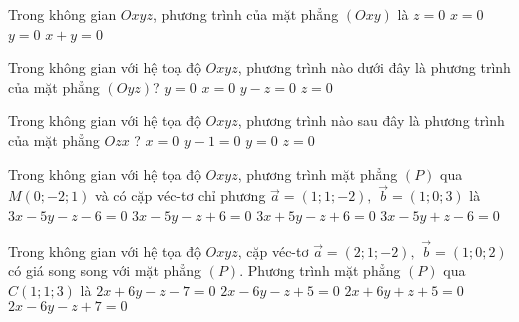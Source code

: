 \begin{ex}%
	Trong không gian $Oxyz$, phương trình của mặt phẳng $(Oxy)$ là
	\choice
	{\True $z=0$}
	{$x=0$}
	{$y=0$}
	{$x+y=0$}
\end{ex}

\begin{ex}%
	Trong không gian với hệ toạ độ $Oxyz$, phương trình nào dưới đây là phương trình của mặt phẳng $(Oyz)$?
	\choice
	{$y=0$}
	{\True $x=0$}
	{$y-z=0$}
	{$z=0$}
\end{ex}
\begin{ex}%
	Trong không gian với hệ tọa độ $O x y z$, phương trình nào sau đây là phương trình của mặt phẳng $O z x$ ?
	\choice
	{$x=0$}
	{$y-1=0$}
	{\True $y=0$}
	{$z=0$}
\end{ex}

\begin{ex}%
	Trong không gian với hệ tọa độ $O x y z$, phương trình mặt phẳng $(P)$ qua $M(0 ;-2 ; 1)$ và có cặp véc-tơ  chỉ phương $\vec{a}=(1 ; 1 ;-2),$ $ \vec{b}=(1 ; 0 ; 3)$ là
	\choice
	{\True $3 x-5 y-z-6=0$}
	{$3 x-5 y-z+6=0$}
	{$3 x+5 y-z+6=0$}
	{$3 x-5 y+z-6=0$}
\end{ex}
\begin{ex}%
	Trong không gian với hệ tọa độ $O x y z$, cặp véc-tơ  $\vec{a}=(2 ; 1 ;-2), $ $\vec{b}=(1 ; 0 ; 2)$ có giá song song với mặt phẳng $(P)$. Phương trình mặt phẳng $(P)$ qua $C(1 ; 1 ; 3)$ là
	\choice
	{$2 x+6 y-z-7=0$}
	{$2 x-6 y-z+5=0$}
	{$2 x+6 y+z+5=0$}
	{\True $2 x-6 y-z+7=0$}
\end{ex}

